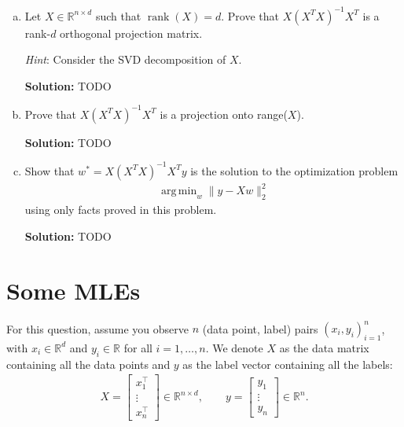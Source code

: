\documentclass{article}
\newcommand{\Question}[1]{\Large \section{ #1 } \normalsize}
\DeclareMathOperator{\rank}{\mathrm{rank}}
\DeclareMathOperator*{\argmin}{arg\,min}
\newenvironment{solution}{\color{blue} \smallskip \textbf{Solution:}}{}
\begin{document}
\begin{enumerate}[(a)]
    \begin{solution}
        TODO
    \end{solution}

    \newpage
    \item Let $X \in \mathbb{R}^{n \times d}$ such that $\rank(X) = d$. Prove that $X(X^{T}X)^{-1}X^{T}$ is a rank-$d$ orthogonal projection matrix. 
    
    \emph{Hint}: Consider the SVD decomposition of $X$. 
    
    \begin{solution}
        TODO
    \end{solution}

    \newpage
    \item
    Prove that $X(X^{T}X)^{-1}X^{T}$ is a projection onto range($X$).
    
    \begin{solution}
        TODO
    \end{solution}

    \newpage
    \item
    Show that $w^{*} = X(X^{T}X)^{-1}X^{T}y$ is the solution to the optimization problem
    \begin{align*}
        \argmin_{w} \|y - Xw\|_{2}^{2}
    \end{align*}
    using only facts proved in this problem.
    
    \begin{solution}
        TODO
    \end{solution}

\end{enumerate}

\newpage
\Question{Some MLEs}
For this question, assume you observe $n$ (data point, label) pairs $(x_i, y_i)_{i=1}^n$, with $x_i\in \mathbb R^d$ and $y_i\in\mathbb R$ for all $i=1,\ldots, n$. We denote $X$ as the data matrix containing all the data points and $y$ as the label vector containing all the labels:
\begin{align*}
    X = \begin{bmatrix} x_1^\top \\\vdots \\ x_n^\top \end{bmatrix} \in \mathbb R^{n\times d}, \qquad y = \begin{bmatrix} y_1 \\ \vdots \\ y_n\end{bmatrix}\in\mathbb R^n.
\end{align*}
\end{document}
